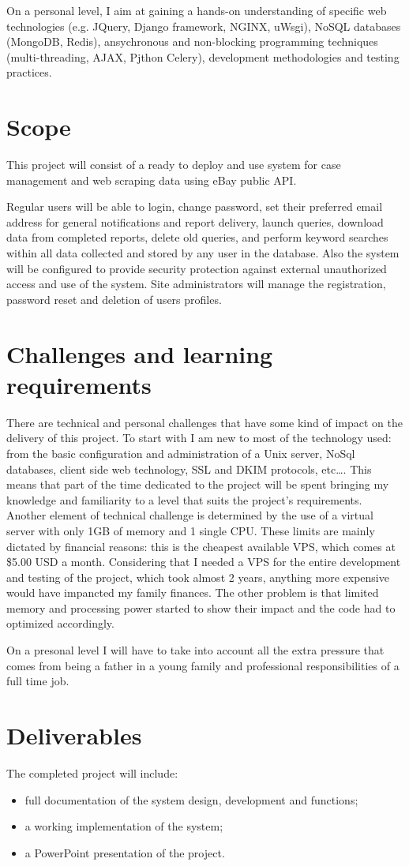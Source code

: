 On a personal level, I aim at gaining a hands-on understanding of specific web
technologies (e.g. JQuery, Django framework, NGINX, uWsgi), NoSQL databases
(MongoDB, Redis), ansychronous and non-blocking programming techniques
(multi-threading, AJAX, Pjthon Celery), development methodologies and testing
practices.


\section{Scope}
This project will consist of a ready to deploy and use system for case
management and web scraping data using eBay public API.

Regular users will be able to login, change password, set their preferred email
address for general notifications and report delivery, launch queries, download
data from completed reports, delete old queries, and perform keyword searches
within all data collected and stored by any user in the database.
Also the system will be configured to provide security protection against external
unauthorized access and use of the system. Site administrators will manage the
registration, password reset and deletion of users profiles.


\section{Challenges and learning requirements}
There are technical and personal challenges that have some kind of impact
on the delivery of this project. To start with I am new to most of the
technology used: from the basic configuration and administration of a Unix
server, NoSql databases, client side web technology, SSL and DKIM protocols,
etc\ldots. This means that part of the time dedicated to the project will be
spent bringing my knowledge and familiarity to a level that suits the project's
requirements. Another element of technical challenge is determined by the use of
a virtual server with only 1GB of memory and 1 single CPU. These limits are
mainly dictated by financial reasons: this is the cheapest available VPS, which
comes at \$5.00 USD a month. Considering that I needed a VPS for the entire
development and testing of the project, which took almost 2 years, anything more
expensive would have impancted my family finances. The other problem is that
limited memory and processing power started to show their impact and the code
had to optimized accordingly.

On a presonal level I will have to take into account all the extra pressure
that comes from being a father in a young family and professional
responsibilities of a full time job.


\section{Deliverables}
The completed project will include:

\begin{itemize}
  \item full documentation of the system design, development and functions;
  \item a working implementation of the system;
  \item a PowerPoint presentation of the project.
\end{itemize}

